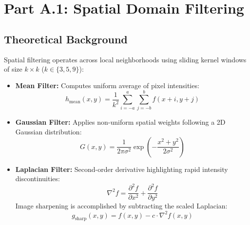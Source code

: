 \documentclass[12pt]{article}
\begin{document}
\section{Part A.1: Spatial Domain Filtering}

\subsection{Theoretical Background}
Spatial filtering operates across local neighborhoods using sliding kernel windows of size $k \times k$ ($k \in \{3, 5, 9\}$):
\begin{itemize}
    \item \textbf{Mean Filter:} Computes uniform average of pixel intensities:
    \begin{equation}
        h_{\text{mean}}(x, y) = \frac{1}{k^2} \sum_{i=-a}^{a} \sum_{j=-b}^{b} f(x+i, y+j)
    \end{equation}
    \item \textbf{Gaussian Filter:} Applies non-uniform spatial weights following a 2D Gaussian distribution:
    \begin{equation}
        G(x, y) = \frac{1}{2\pi\sigma^2} \exp\left(-\frac{x^2+y^2}{2\sigma^2}\right)
    \end{equation}
    \item \textbf{Laplacian Filter:} Second-order derivative highlighting rapid intensity discontinuities:
    \begin{equation}
        \nabla^2 f = \frac{\partial^2 f}{\partial x^2} + \frac{\partial^2 f}{\partial y^2}
    \end{equation}
    Image sharpening is accomplished by subtracting the scaled Laplacian:
    \begin{equation}
        g_{\text{sharp}}(x, y) = f(x, y) - c \cdot \nabla^2 f(x, y)
    \end{equation}
\end{itemize}
\end{document}
